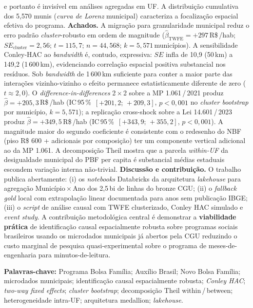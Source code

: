 \documentclass[12pt,a4paper,oneside]{article}
\newcommand{\rs}{R\$\,}
\begin{document}
\begin{singlespace}
\textemdash{} e portanto é invisível em análises agregadas em UF. A
distribuição cumulativa dos 5{,}570 munis (\textit{curva de Lorenz}
municipal) caracteriza a focalização espacial efetiva do programa.
\textbf{Achados.} A migração para granularidade municipal reduz o erro
padrão \textit{cluster}-robusto em ordem de magnitude
($\hat{\beta}_{\text{TWFE}} = +297$\,\rs/hab; $SE_{\text{cluster}} =
2{,}56$; $t = 115{,}7$; $n = 44{,}568$; $k = 5{,}571$\,municípios). A
sensibilidade Conley-HAC ao \textit{bandwidth} é, contudo, expressiva:
$SE$ infla de 10{,}9 (50\,km) a 149{,}2 (1\,600\,km), evidenciando
correlação espacial positiva substancial nos resíduos. Sob
\textit{bandwidth} de 1\,600\,km \textemdash{} suficiente para conter a
maior parte das interações vizinho-vizinho \textemdash{} o efeito
permanece estatisticamente diferente de zero ($t \approx 2{,}0$). O
\textit{difference-in-differences} 2\,$\times$\,2 sobre a MP
1.061\,/\,2021 produz $\hat{\beta} = +205{,}3$\,\rs/hab
(IC\,95\,\%~$[+201{,}2;\,+209{,}3]$, $p < 0{,}001$ no \textit{cluster
bootstrap} por município, $k = 5{,}571$); a replicação cross-shock
sobre a Lei 14.601\,/\,2023 produz $\hat{\beta} = +349{,}5$\,\rs/hab
(IC\,95\,\%~$[+343{,}9;\,+355{,}2]$, $p < 0{,}001$). A magnitude maior
do segundo coeficiente é consistente com o redesenho do NBF (piso
\rs\,600 + adicionais por composição) ter um componente vertical
adicional ao da MP 1.061. A decomposição Theil mostra que a parcela
\textit{within-UF} da desigualdade municipal do PBF per capita é
substancial \textemdash{} médias estaduais escondem variação interna
não-trivial. \textbf{Discussão e contribuição.} O trabalho publica
abertamente: (i) os \textit{notebooks} Databricks da arquitetura
\textit{lakehouse} para agregação Município\,$\times$\,Ano dos 2{,}5\,bi
de linhas do bronze CGU; (ii) o \textit{fallback gold} local com
extrapolação linear documentada para anos sem publicação IBGE; (iii) o
\textit{script} de análise causal com TWFE clusterizado, Conley HAC
simulado e \textit{event study}. A contribuição metodológica central é
demonstrar a \textbf{viabilidade prática} de identificação causal
espacialmente robusta sobre programas sociais brasileiros usando os
microdados municipais já abertos pela CGU \textemdash{} reduzindo o
custo marginal de pesquisa quasi-experimental sobre o programa de
meses-de-engenharia para minutos-de-leitura.

\vspace{0.4cm}\noindent\textbf{Palavras-chave:}
Programa Bolsa Família; Auxílio Brasil; Novo Bolsa Família;
microdados municipais; identificação causal espacialmente robusta;
\textit{Conley HAC}; \textit{two-way fixed effects}; \textit{cluster
bootstrap}; decomposição Theil within\,/\,between; heterogeneidade
intra-UF; arquitetura medallion; \textit{lakehouse}.
\end{singlespace}
\end{document}

